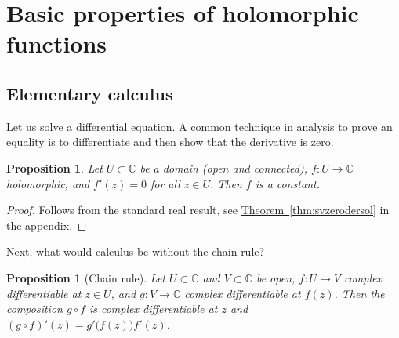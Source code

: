\documentclass[12pt,openany]{book}
\newcommand{\C}{{\mathbb{C}}}
\theoremstyle{plain}
\newtheorem{prop}[thm]{Proposition}
\theoremstyle{remark}
\theoremstyle{definition}
\theoremstyle{exercise}
\theoremstyle{example}
\newcommand{\thmref}[1]{\hyperref[#1]{Theorem~\ref*{#1}}}
\begin{document}

\section{Basic properties of holomorphic functions}

\subsection{Elementary calculus}

Let us solve a differential equation.  A common technique in analysis
to prove an equality is to differentiate and then show that the derivative is
zero.

\begin{prop} \label{prop:zeroder}
Let $U \subset \C$ be a domain (open and connected),
$f \colon U \to \C$ holomorphic, and $f'(z) = 0$ for all $z \in U$.
Then $f$ is a constant.
\end{prop}

\begin{proof}
Follows from the standard real result,
see \thmref{thm:svzerodersol} in the appendix.
\end{proof}

Next, what would calculus be without the chain rule?

\begin{prop}[Chain rule] 
Let $U \subset \C$ and $V \subset \C$ be open, $f \colon U \to V$
complex differentiable at $z \in U$, and $g \colon V \to \C$ complex differentiable
at $f(z)$.  Then the composition $g \circ f$
is complex differentiable at $z$ and $(g \circ f)'(z) = g'\bigl(f(z)\bigr) f'(z)$.
\end{prop}
\end{document}
